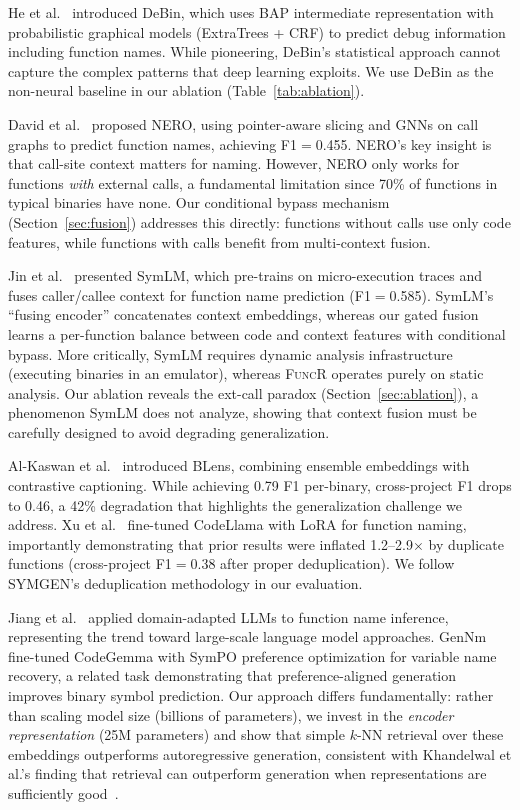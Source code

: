 \documentclass[sigconf,nonacm]{acmart}
\newcommand{\sysname}{\textsc{FuncR}}
\begin{document}
He et al.~\cite{debin} introduced DeBin, which uses BAP intermediate representation with probabilistic graphical models (ExtraTrees + CRF) to predict debug information including function names. While pioneering, DeBin's statistical approach cannot capture the complex patterns that deep learning exploits. We use DeBin as the non-neural baseline in our ablation (Table~\ref{tab:ablation}).

David et al.~\cite{nero} proposed NERO, using pointer-aware slicing and GNNs on call graphs to predict function names, achieving F1$=$0.455. NERO's key insight is that call-site context matters for naming. However, NERO only works for functions \emph{with} external calls, a fundamental limitation since 70\% of functions in typical binaries have none. Our conditional bypass mechanism (Section~\ref{sec:fusion}) addresses this directly: functions without calls use only code features, while functions with calls benefit from multi-context fusion.

Jin et al.~\cite{symlm} presented SymLM, which pre-trains on micro-execution traces and fuses caller/callee context for function name prediction (F1$=$0.585). SymLM's ``fusing encoder'' concatenates context embeddings, whereas our gated fusion learns a per-function balance between code and context features with conditional bypass. More critically, SymLM requires dynamic analysis infrastructure (executing binaries in an emulator), whereas \sysname{} operates purely on static analysis. Our ablation reveals the ext-call paradox (Section~\ref{sec:ablation}), a phenomenon SymLM does not analyze, showing that context fusion must be carefully designed to avoid degrading generalization.

Al-Kaswan et al.~\cite{blens} introduced BLens, combining ensemble embeddings with contrastive captioning. While achieving 0.79 F1 per-binary, cross-project F1 drops to 0.46, a 42\% degradation that highlights the generalization challenge we address. Xu et al.~\cite{symgen} fine-tuned CodeLlama with LoRA for function naming, importantly demonstrating that prior results were inflated 1.2--2.9$\times$ by duplicate functions (cross-project F1$=$0.38 after proper deduplication). We follow SYMGEN's deduplication methodology in our evaluation.

Jiang et al.~\cite{beyondclass} applied domain-adapted LLMs to function name inference, representing the trend toward large-scale language model approaches. GenNm~\cite{gennm} fine-tuned CodeGemma with SymPO preference optimization for variable name recovery, a related task demonstrating that preference-aligned generation improves binary symbol prediction. Our approach differs fundamentally: rather than scaling model size (billions of parameters), we invest in the \emph{encoder representation} (25M parameters) and show that simple $k$-NN retrieval over these embeddings outperforms autoregressive generation, consistent with Khandelwal et al.'s finding that retrieval can outperform generation when representations are sufficiently good~\cite{knnlm,knnmt}.
\end{document}
